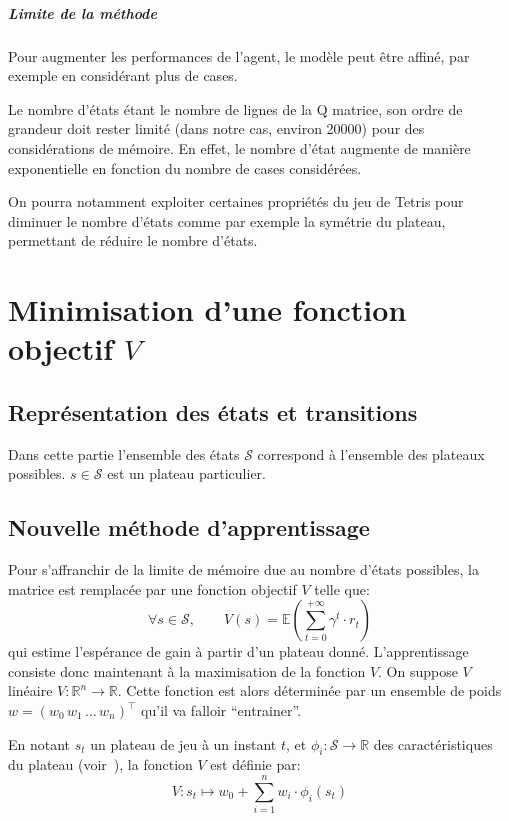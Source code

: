 \documentclass{report}
\newcommand{\R}{\mathbb{R}}
\begin{document}
\paragraph{Limite de la méthode}
Pour augmenter les performances de l'agent, le modèle peut être affiné, par
exemple en considérant plus de cases.

Le nombre d'états étant le nombre de lignes de la Q matrice, son ordre de
grandeur doit rester limité (dans notre cas, environ 20000) pour des
considérations de mémoire. En effet, le nombre d'état augmente de manière
exponentielle en fonction du nombre de cases considérées.

On pourra notamment exploiter certaines propriétés du jeu de Tetris pour
diminuer le nombre d'états comme par exemple la symétrie du plateau, permettant
de réduire le nombre d'états.


\chapter{Minimisation d'une fonction objectif \(V\)}

\section{Représentation des états et transitions}

Dans cette partie l'ensemble des états \( \mathcal{S} \) correspond à l'ensemble
des plateaux possibles. \( s \in \mathcal{S} \) est un plateau particulier.

\section{Nouvelle méthode d'apprentissage}

Pour s'affranchir de la limite de mémoire due au nombre d'états possibles, la
matrice est remplacée par une fonction objectif \( V \) telle que:
\[
  \forall s \in \mathcal{S}, \qquad V(s) =
  \mathbb{E}\left(\sum_{t=0}^{+\infty} \gamma ^t \cdot r_t\right)
\]
qui estime l'espérance de gain à partir d'un plateau donné.
L'apprentissage consiste donc maintenant à la maximisation de la
fonction \( V \).
On suppose \( V \) linéaire \(V \colon \R^n \to \R\). Cette fonction est alors
déterminée par un ensemble de poids \(w = (w_0\, w_1\, \dots\, w_n)^\top\)
qu'il va falloir ``entrainer''.

En notant \( s_t \) un plateau de jeu à un instant \( t \), et
\(\phi_i\colon \mathcal{S} \to \R\) des caractéristiques du plateau
(voir~\cite{boumaza13}), la fonction \(V\)
est définie par:
\[
  V \colon s_t \mapsto w_0 + \sum_{i=1}^n w_i \cdot \phi_i (s_t)
\]
\end{document}
